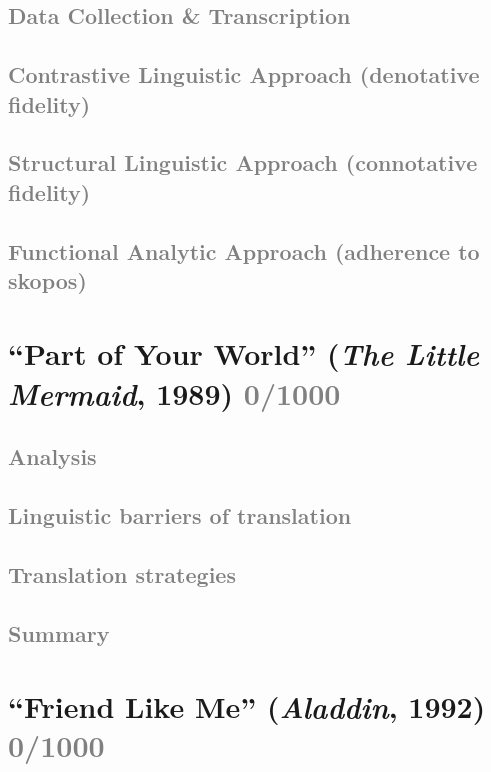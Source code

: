 \documentclass[12pt]{article}
\begin{document}
    \subsection{\textcolor{gray}{Data Collection \& Transcription}}
    
    \subsection{\textcolor{gray}{Contrastive Linguistic Approach (denotative fidelity)}}
    
    \subsection{\textcolor{gray}{Structural Linguistic Approach (connotative fidelity)}}

    \subsection{\textcolor{gray}{Functional Analytic Approach (adherence to skopos)}}
    
\newpage\section{“Part of Your World” (\textit{The Little Mermaid}, 1989) \textcolor{gray}{0/1000}}

    \subsection{\textcolor{gray}{Analysis}}
    \vspace{12em}
    \subsection{\textcolor{gray}{Linguistic barriers of translation}}
    \vspace{12em}
    \subsection{\textcolor{gray}{Translation strategies}}
    \vspace{12em}
    \subsection{\textcolor{gray}{Summary}}
    
\newpage\section{“Friend Like Me” (\textit{Aladdin}, 1992) \textcolor{gray}{0/1000}}
\end{document}
